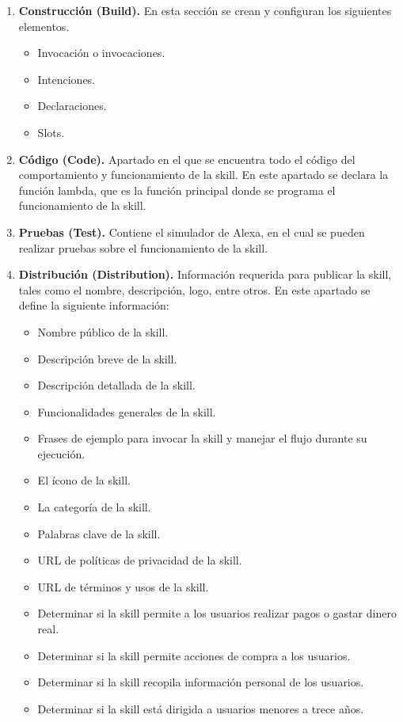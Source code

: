 \begin{enumerate}
  \item \textbf{Construcción (Build).} En esta sección se crean y configuran los siguientes elementos.
  \begin{itemize}
    \item Invocación o invocaciones.
    \item Intenciones.
    \item Declaraciones.
    \item Slots.
  \end{itemize}
  \item \textbf{Código (Code).} Apartado en el que se encuentra todo el código del comportamiento y funcionamiento de la skill. En este apartado se declara la función lambda, que es la función principal donde se programa el funcionamiento de la skill.
  \item \textbf{Pruebas (Test).} Contiene el simulador de Alexa, en el cual se pueden realizar pruebas sobre el funcionamiento de la skill.
  \item \textbf{Distribución (Distribution).} Información requerida para publicar la skill, tales como el nombre, descripción, logo, entre otros. En este apartado se define la siguiente información:
  \begin{itemize}
    \item Nombre público de la skill.
    \item Descripción breve de la skill.
    \item Descripción detallada de la skill.
    \item Funcionalidades generales de la skill.
    \item Frases de ejemplo para invocar la skill y manejar el flujo durante su ejecución.
    \item El ícono de la skill.
    \item La categoría de la skill.
    \item Palabras clave de la skill.
    \item URL de políticas de privacidad de la skill.
    \item URL de términos y usos de la skill.
    \item Determinar si la skill permite a los usuarios realizar pagos o gastar dinero real.
    \item Determinar si la skill permite acciones de compra a los usuarios.
    \item Determinar si la skill recopila información personal de los usuarios.
    \item Determinar si la skill está dirigida a usuarios menores a trece años.

\end{itemize}
\end{enumerate}
